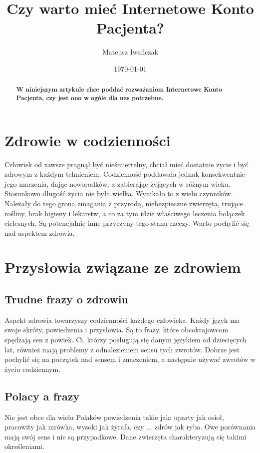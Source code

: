 \documentclass[11pt,a4paper]{article}
\title{Czy warto mieć Internetowe Konto Pacjenta?}
\author{Mateusz Iwańczak}
\date{\today}
\begin{document}
\maketitle

\begin{abstract}
\textbf{W niniejszym artykule chce poddać rozważaniom Internetowe Konto Pacjenta, czy jest ono w ogóle dla nas potrzebne.}
\end{abstract}

\section{Zdrowie w codzienności}
Człowiek od zawsze pragnął być nieśmiertelny, chciał mieć dostatnie życie i być zdrowym z każdym tchnieniem. Codzienność poddawała jednak konsekwentnie jego marzenia, dając noworodków, a zabierając żyjących w różnym wieku. Stosunkowo długość życia nie była wielka. Wynikało to z wielu czynników. Należały do tego grona zmagania z przyrodą, niebezpieczne zwierzęta, trujące rośliny, brak higieny i lekarstw, a co za tym idzie właściwego leczenia bolączek cielesnych. Są potencjalnie inne przyczyny tego stanu rzeczy. Warto pochylić się nad aspektem zdrowia. 

\section{Przysłowia związane ze zdrowiem}
\subsection{Trudne frazy o zdrowiu}
Aspekt zdrowia towarzyszy codzienności każdego człowieka. Każdy język ma swoje skróty, powiedzenia i przysłowia. Są to frazy, które  obcokrajowcom spędzają sen z powiek. Ci, którzy posługują się danym językiem od dziecięcych lat, również mają problemy z odnalezieniem sensu tych zwrotów. Dobrze jest pochylić się na początek nad sensem i znaczeniem, a następnie używać zwrotów w życiu codziennym.

\subsection{Polacy a frazy}
Nie jest obce dla wielu Polaków powiedzenia takie jak: uparty jak osioł, pracowity jak mrówka, wysoki jak żyrafa, czy ... zdrów jak ryba. Owe porównania mają swój sens i nie są przypadkowe. Dane zwierzęta charakteryzują się takimi określeniami.
\end{document}
